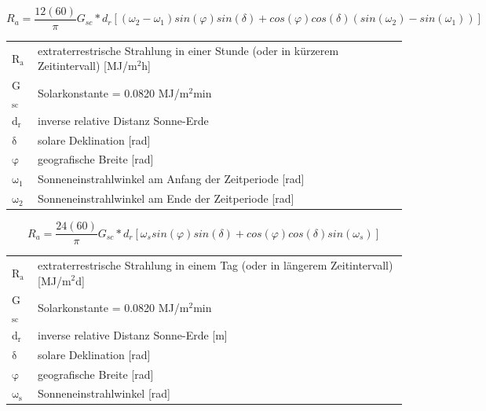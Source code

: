 \begin{appendix}
\begin{description}
\begin{equation}
\label{eq:Ra_short_period}
R_{a}=\frac{12 (60)}{\pi}G_{sc}*d_{r}[(\omega _{2}-\omega _{1})sin(\varphi)sin(\delta)+cos(\varphi)cos(\delta)(sin(\omega _{2})- sin(\omega _{1}))]
\end{equation}
\begin{table}[H]
\centering
\begin{tabular}{ll}
R$\mathrm{_{a}}$ & extraterrestrische Strahlung in einer Stunde (oder in kürzerem Zeitintervall) [MJ/m$\mathrm{^{2}}$h]\\
G$\mathrm{_{sc}}$ & Solarkonstante = 0.0820 MJ/m$\mathrm{^{2}}$min\\
d$\mathrm{_{r}}$ & inverse relative Distanz Sonne-Erde\\
$\mathrm{\delta}$ & solare Deklination [rad]\\
$\mathrm{\varphi}$ & geografische Breite [rad]\\
$\mathrm{\omega_{1}}$ & Sonneneinstrahlwinkel am Anfang der Zeitperiode [rad]\\
$\mathrm{\omega_{2}}$ & Sonneneinstrahlwinkel am Ende der Zeitperiode [rad]\\
\end{tabular}
\end{table}

\begin{equation}
\label{eq:Ra_long_period}
R_{a}=\frac{24 (60)}{\pi}G_{sc}*d_{r}[\omega _{s}sin(\varphi)sin(\delta)+cos(\varphi)cos(\delta)sin(\omega _{s})]
\end{equation}
\begin{table}[H]
\centering
\begin{tabular}{ll}
R$\mathrm{_{a}}$ & extraterrestrische Strahlung in einem Tag (oder in längerem Zeitintervall) [MJ/m$\mathrm{^{2}}$d]\\
G$\mathrm{_{sc}}$ & Solarkonstante = 0.0820 MJ/m$\mathrm{^{2}}$min\\
d$\mathrm{_{r}}$ & inverse relative Distanz Sonne-Erde [m]\\
$\mathrm{\delta}$ & solare Deklination [rad]\\
$\mathrm{\varphi}$ & geografische Breite [rad]\\
$\mathrm{\omega_{s}}$ & Sonneneinstrahlwinkel [rad]\\
\end{tabular}
\end{table}


\end{description}
\end{appendix}
